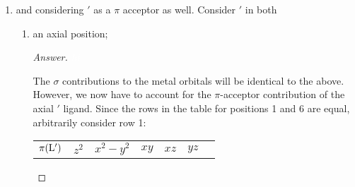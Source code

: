 \documentclass[../psets.tex]{subfiles}
\begin{document}
\begin{enumerate}[label={\Roman*)}]
\begin{enumerate}[label={\textbf{10.\arabic*}}]
\begin{enumerate}[label={\textbf{\alph*.}}]
\begin{proof}[Answer]
\begin{center}
                \end{center}
                With the sums for each $d$ orbital, we can determine that the metal orbitals are destabilized by\footnote{We don't distinguish between $e_\sigma(\ce{L})$ and $e_\sigma(\ce{L}')$ here because we are told that both ligands have comparable $\sigma$-donating abilities.}:
                \begin{align*}
                    E(d_{z^2}) &= \frac{11}{4}e_\sigma\\
                    E(d_{x^2-y^2}) &= \frac{9}{8}e_\sigma\\
                    E(d_{xy}) &= \frac{9}{8}e_\sigma\\
                    E(d_{xz}) &= 0\\
                    E(d_{yz}) &= 0
                \end{align*}
            \end{proof}
            \item and considering $'$ as a $\pi$ acceptor as well. Consider $'$ in both
            \begin{enumerate}[label={(\arabic*)}]
                \item an axial position;
                \begin{proof}[Answer]
                    ${\color{white}hi}$
                    \begin{center}
                    \end{center}
                    \vspace{1em}
                    The $\sigma$ contributions to the metal orbitals will be identical to the above. However, we now have to account for the $\pi$-acceptor contribution of the axial $'$ ligand. Since the rows in the table for positions 1 and 6 are equal, arbitrarily consider row 1:
                    \begin{center}
                        \small
                        \renewcommand{\arraystretch}{1.4}
                        \begin{tabular}{c|cccccc}
                            $\pi(\ce{L}')$ & $z^2$ & $x^2-y^2$ & $xy$ & $xz$ & $yz$\\

\end{tabular}
\end{center}
\end{proof}
\end{enumerate}
\end{enumerate}
\end{enumerate}
\end{enumerate}
\end{document}

